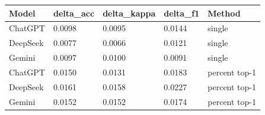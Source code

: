 \begin{tabular}{lllll}
\toprule
Model & delta_acc & delta_kappa & delta_f1 & Method \\
\midrule
ChatGPT & 0.0098 & 0.0095 & 0.0144 & single \\
DeepSeek & 0.0077 & 0.0066 & 0.0121 & single \\
Gemini & 0.0097 & 0.0100 & 0.0091 & single \\
ChatGPT & 0.0150 & 0.0131 & 0.0183 & percent top-1 \\
DeepSeek & 0.0161 & 0.0158 & 0.0227 & percent top-1 \\
Gemini & 0.0152 & 0.0152 & 0.0174 & percent top-1 \\
\bottomrule
\end{tabular}
